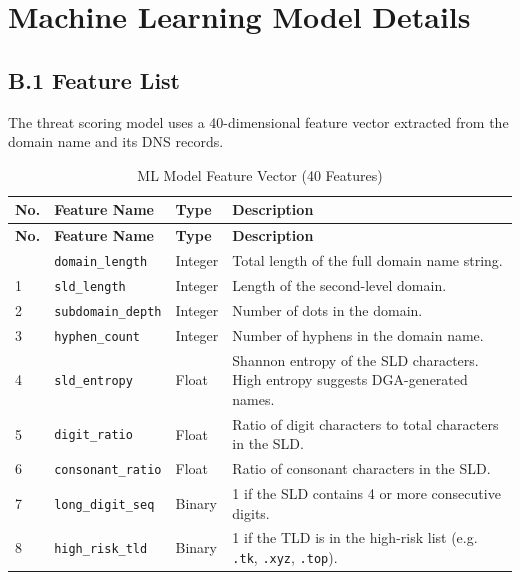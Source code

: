\documentclass[12pt, a4paper, oneside]{report}
\begin{document}
\chapter{Machine Learning Model Details}
\label{app:ml}

\section*{B.1 Feature List}

The threat scoring model uses a 40-dimensional feature vector extracted from the domain name and its DNS records.

\begin{longtable}{|p{0.8cm}|p{4.5cm}|p{2cm}|p{6.5cm}|}
\caption{ML Model Feature Vector (40 Features)}\\
\hline
\rowcolor{nfsuBlue!15}
\textbf{No.} & \textbf{Feature Name} & \textbf{Type} & \textbf{Description} \\
\hline
\endfirsthead
\hline
\rowcolor{nfsuBlue!15}
\textbf{No.} & \textbf{Feature Name} & \textbf{Type} & \textbf{Description} \\
\hline
\endhead
\hline
\endfoot
0 & \texttt{domain\_length} & Integer & Total length of the full domain name string. \\
\hline
1 & \texttt{sld\_length} & Integer & Length of the second-level domain. \\
\hline
2 & \texttt{subdomain\_depth} & Integer & Number of dots in the domain. \\
\hline
3 & \texttt{hyphen\_count} & Integer & Number of hyphens in the domain name. \\
\hline
4 & \texttt{sld\_entropy} & Float & Shannon entropy of the SLD characters. High entropy suggests DGA-generated names. \\
\hline
5 & \texttt{digit\_ratio} & Float & Ratio of digit characters to total characters in the SLD. \\
\hline
6 & \texttt{consonant\_ratio} & Float & Ratio of consonant characters in the SLD. \\
\hline
7 & \texttt{long\_digit\_seq} & Binary & 1 if the SLD contains 4 or more consecutive digits. \\
\hline
8 & \texttt{high\_risk\_tld} & Binary & 1 if the TLD is in the high-risk list (e.g. \texttt{.tk}, \texttt{.xyz}, \texttt{.top}). \\

\end{longtable}
\end{document}
